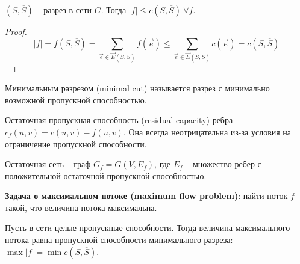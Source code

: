 	\begin{Lm}
		$(S, \overline{S})$ -- разрез в сети $G$. Тогда $|f| \leqslant c(S, \overline{S}) \ \forall f$.  
	\end{Lm}

	\begin{proof}
		\[|f| = f(S, \overline{S}) = \sum_{\overrightarrow{e} \in \overrightarrow{E}(S, \overline{S})} f(\overrightarrow{e}) \leqslant \sum_{\overrightarrow{e} \in \overrightarrow{E}(S, \overline{S})} c(\overrightarrow{e}) = c(S, \overline{S})\]
	\end{proof}

	\begin{Def}
		Минимальным разрезом (minimal cut) называется разрез с минимально возможной пропускной способностью.
	\end{Def}

	\begin{Def}
		Остаточная пропускная способность (residual capacity) ребра $c_f (u, v) = c(u, v) - f(u, v)$. Она всегда неотрицательна из-за условия на ограничение пропускной способности.
	\end{Def}

	\begin{Def}
		Остаточная сеть -- граф $G_f = G(V, E_f)$, где $E_f$ -- множество ребер с положительной остаточной пропускной способностью. 
	\end{Def}

	\def\AuthorName{Дарья Гольденберг}

	\textbf{Задача о максимальном потоке (maximum flow problem)}: найти поток $f$ такой, что величина потока максимальна.

	\begin{Thm}
		Пусть в сети целые пропускные способности. Тогда величина максимального потока равна пропускной способности 
		минимального разреза: $\max |f| = \min c(S, \overline{S})$. 
	\end{Thm}

